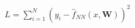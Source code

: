 \documentclass[preview]{standalone}
\begin{document}
\begin{align*}
L = \sum_{i=1}^N \left(y_i - \hat{f}_{NN}(x,\mathbf{W})\right)^2
\end{align*}
\end{document}
